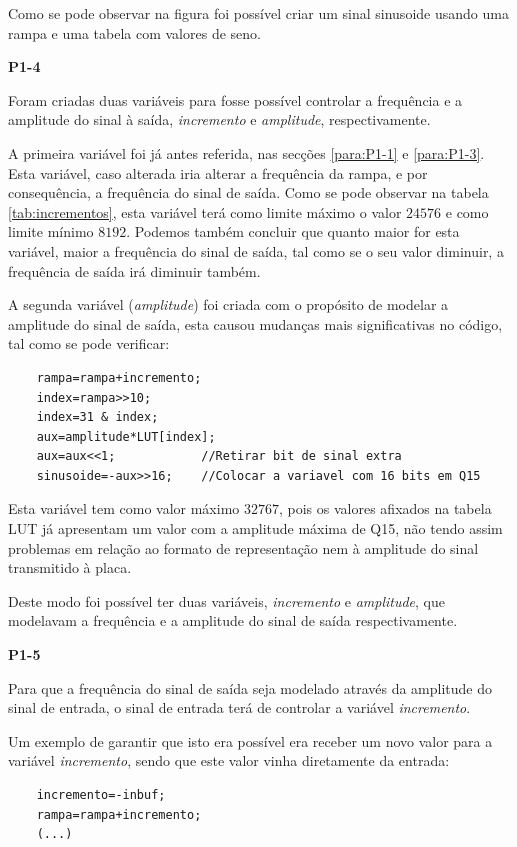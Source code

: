 \documentclass[11pt]{article}
\begin{document}
Como se pode observar na figura foi possível criar um sinal sinusoide usando uma rampa e uma tabela com valores de seno.

\textbf{P1-4}
\label{para:P1-4}

Foram criadas duas variáveis para fosse possível controlar a frequência e a amplitude do sinal à saída, \textit{incremento} e \textit{amplitude}, respectivamente.

A primeira variável foi já antes referida, nas secções \ref{para:P1-1} e \ref{para:P1-3}. Esta variável, caso alterada iria alterar a frequência da rampa, e por consequência, a frequência do sinal de saída. Como se pode observar na tabela \ref{tab:incrementos}, esta variável terá como limite máximo o valor $ 24576 $ e como limite mínimo $ 8192 $. Podemos também concluir que quanto maior for esta variável, maior a frequência do sinal de saída, tal como se o seu valor diminuir, a frequência de saída irá diminuir também.

A segunda variável (\textit{amplitude}) foi criada com o propósito de modelar a amplitude do sinal de saída, esta causou mudanças mais significativas no código, tal como se pode verificar:

\begin{lstlisting}
	rampa=rampa+incremento;
	index=rampa>>10;
	index=31 & index;        
	aux=amplitude*LUT[index];
	aux=aux<<1;            //Retirar bit de sinal extra
	sinusoide=-aux>>16;    //Colocar a variavel com 16 bits em Q15
\end{lstlisting}

Esta variável tem como valor máximo $ 32767 $, pois os valores afixados na tabela LUT já apresentam um valor com a amplitude máxima de Q15, não tendo assim problemas em relação ao formato de representação nem à amplitude do sinal transmitido à placa.

Deste modo foi possível ter duas variáveis, \textit{incremento} e \textit{amplitude}, que modelavam a frequência e a amplitude do sinal de saída respectivamente.

\textbf{P1-5}
\label{para:P1-5}

Para que a frequência do sinal de saída seja modelado através da amplitude do sinal de entrada, o sinal de entrada terá de controlar a variável \textit{incremento}.

Um exemplo de garantir que isto era possível era receber um novo valor para a variável \textit{incremento}, sendo que este valor vinha diretamente da entrada:

\begin{lstlisting}
	incremento=-inbuf;
	rampa=rampa+incremento;
	(...)
\end{lstlisting}
\end{document}
